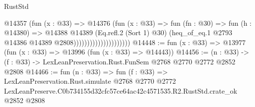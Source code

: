 \begin{lexlean}{RustStd}
\begin{coremodule}
                                      @14357
                                        (fun (x : @33) =>
                                        @14376
                                          (fun (x : @33) =>
                                          fun (fn : @30) =>
                                          fun (h : @14380) =>
                                          @14388
                                            @14389
                                            (Eq.refl.{2} (Sort 1) @30)
                                            (heq_of_eq.{1}
                                              @2793
                                              @14386
                                              @14389
                                              @2808)))))))))))))))))))))
@14448 := fun (x : @33) => @13977 (fun (x : @33) => @13996 (fun (x : @33) => @14443))
@14456 := (n : @33) -> (f : @33) -> LexLeanPreservation.Rust.FunSem @2768 @2770 @2772 @2852 @2808
@14466 := fun (n : @33) =>
  fun (f : @33) =>
  LexLeanPreservation.Rust.simulate
    @2768
    @2770
    @2772
    LexLeanPreserve.C0b734155d32cfc57ce64ac42c4571535.R2.RustStd.crate_ok
    @2852
    @2808
\end{coremodule}
\end{lexlean}

